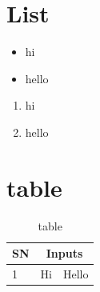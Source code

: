 \documentclass[11pt,a4paper]{article}
\begin{document}
	\section{List}
	\begin{itemize}
		\item hi
		\item hello
	\end{itemize}
	\begin{enumerate}
		\item hi
		\item hello
	\end{enumerate}
\section{table}
\begin{table}[h]
	\centering
	\caption{table}
	\label{tab:Table}
	\begin{tabular}{l|c|r}\hline
		SN&\multicolumn{2}{c}{Inputs} \\ \hline
		1& Hi & Hello \\ \hline
	\end{tabular}
\end{table}

\end{document}
